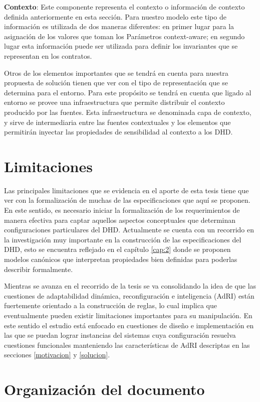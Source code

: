 {\textbf{Contexto}: Este componente representa el contexto o información de
contexto definida anteriormente en esta sección. Para nuestro modelo este tipo
de información es utilizada de dos maneras diferentes: en primer lugar para la
asignación de los valores que toman los Parámetros context-aware; en segundo
lugar esta información puede ser utilizada para definir los invariantes que se
representan en los contratos.


Otros de los elementos importantes que se tendrá en cuenta para nuestra
propuesta de solución tienen que ver con el tipo de representación que se
determina para el entorno. Para este propósito se tendrá en cuenta que ligado al
entorno se provee una infraestructura que permite distribuir el contexto
producido por las fuentes. Esta infraestructura se denominada capa de contexto,
y sirve de intermediaria entre las fuentes contextuales y los elementos que
permitirán  inyectar las propiedades de sensibilidad al contexto a los DHD.

\section{Limitaciones}	

Las principales limitaciones que se evidencia en el aporte de esta tesis tiene
que ver con la formalización de muchas de las especificaciones que aquí se
proponen. En este sentido, es necesario iniciar la formalización de los
requerimientos de manera efectiva para captar aquellos aspectos conceptuales
que determinan configuraciones particulares del DHD. Actualmente se cuenta con
un recorrido en la investigación muy importante en la construcción de las
especificaciones del DHD, esto se encuentra reflejado en el capítulo
\ref{cap:2} donde se proponen modelos canónicos que interpretan propiedades
bien definidas para poderlas describir formalmente. 


Mientras se avanza en el recorrido de la tesis se va consolidando la idea de
que las cuestiones de adaptabilidad dinámica, reconfiguración e inteligencia
(AdRI) están fuertemente orientado a la construcción de reglas, lo cual
implica que eventualmente pueden existir limitaciones importantes para su
manipulación. En este sentido el estudio está enfocado en cuestiones de
diseño e implementación en las que se puedan lograr instancias del sistemas
cuya configuración resuelva cuestiones funcionales manteniendo las
características de AdRI descriptas en las secciones \ref{motivacion}
y \ref{solucion}.


\section{Organización del documento}

}
